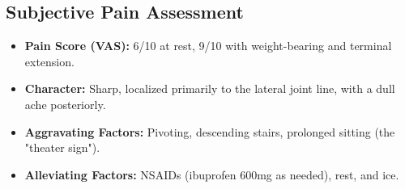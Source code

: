 \subsection{Subjective Pain Assessment}
\begin{itemize}
  \item \textbf{Pain Score (VAS):} 6/10 at rest, 9/10 with weight-bearing and terminal extension.
  \item \textbf{Character:} Sharp, localized primarily to the lateral joint line, with a dull ache posteriorly.
  \item \textbf{Aggravating Factors:} Pivoting, descending stairs, prolonged sitting (the "theater sign").
  \item \textbf{Alleviating Factors:} NSAIDs (ibuprofen 600mg as needed), rest, and ice.
\end{itemize}

